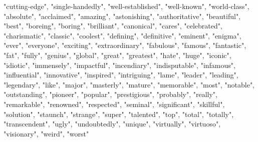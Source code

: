 "cutting-edge", "single-handedly", "well-established", "well-known",
"world-class", "absolute", "acclaimed", "amazing", "astonishing",
"authoritative", "beautiful", "best", "boreing", "boring", "brilliant",
"canonical", "cares", "celebrated", "charismatic", "classic",
"coolest", "defining", "definitive", "eminent", "enigma", "ever",
"everyone", "exciting", "extraordinary", "fabulous", "famous",
"fantastic", "fat", "fully", "genius", "global", "great", "greatest",
"hate", "huge", "iconic", "idiotic", "immensely", "impactful",
"incendiary", "indisputable", "infamous", "influential", "innovative",
"inspired", "intriguing", "lame", "leader", "leading", "legendary",
"like", "major", "masterly", "mature", "memorable", "most", "notable",
"outstanding", "pioneer", "popular", "prestigious", "probably",
"really", "remarkable", "renowned", "respected", "seminal",
"significant", "skillful", "solution", "staunch", "strange", "super",
"talented", "top", "total", "totally", "transcendent", "ugly",
"undoubtedly", "unique", "virtually", "virtuoso", "visionary", "weird",
"worst"
